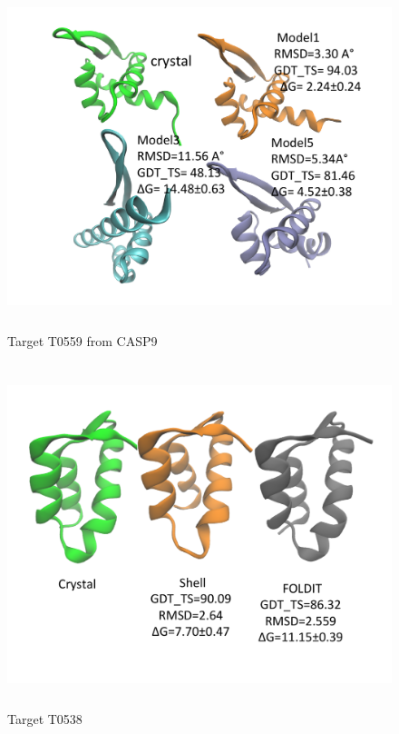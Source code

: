 \documentclass[12pt]{article}
\begin{document}
\begin{figure}
\begin{center}
\includegraphics[width=12cm,height=10cm]{T0559.pdf}
\end{center}
\caption{Target T0559 from CASP9}
\label{fig:T0559}
\end{figure}

\begin{figure}
\begin{center}
\includegraphics[width=12cm,height=10cm]{T0538.pdf}
\end{center}
\caption{Target T0538}
\label{fig:T0538}
\end{figure}
\end{document}
